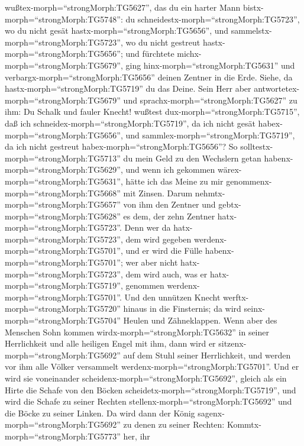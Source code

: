 wußtex-morph=``strongMorph:TG5627'', das du ein harter Mann
bistx-morph=``strongMorph:TG5748'': du
schneidestx-morph=``strongMorph:TG5723'', wo du nicht gesät
hastx-morph=``strongMorph:TG5656'', und
sammelstx-morph=``strongMorph:TG5723'', wo du nicht gestreut
hastx-morph=``strongMorph:TG5656'';  und fürchtete
michx-morph=``strongMorph:TG5679'', ging
hinx-morph=``strongMorph:TG5631'' und
verbargx-morph=``strongMorph:TG5656'' deinen Zentner in die Erde. Siehe,
da hastx-morph=``strongMorph:TG5719'' du das Deine.  Sein
Herr aber antwortetex-morph=``strongMorph:TG5679'' und
sprachx-morph=``strongMorph:TG5627'' zu ihm: Du Schalk und fauler
Knecht! wußtest dux-morph=``strongMorph:TG5715'', daß ich
schneidex-morph=``strongMorph:TG5719'', da ich nicht gesät
habex-morph=``strongMorph:TG5656'', und
sammlex-morph=``strongMorph:TG5719'', da ich nicht gestreut
habex-morph=``strongMorph:TG5656''?  So
solltestx-morph=``strongMorph:TG5713'' du mein Geld zu den Wechslern
getan habenx-morph=``strongMorph:TG5629'', und wenn ich gekommen
wärex-morph=``strongMorph:TG5631'', hätte ich das Meine zu mir
genommenx-morph=``strongMorph:TG5668'' mit Zinsen.  Darum
nehmtx-morph=``strongMorph:TG5657'' von ihm den Zentner und
gebtx-morph=``strongMorph:TG5628'' es dem, der zehn Zentner
hatx-morph=``strongMorph:TG5723''.  Denn wer da
hatx-morph=``strongMorph:TG5723'', dem wird gegeben
werdenx-morph=``strongMorph:TG5701'', und er wird die Fülle
habenx-morph=``strongMorph:TG5701''; wer aber nicht
hatx-morph=``strongMorph:TG5723'', dem wird auch, was er
hatx-morph=``strongMorph:TG5719'', genommen
werdenx-morph=``strongMorph:TG5701''.  Und den unnützen
Knecht werftx-morph=``strongMorph:TG5720'' hinaus in die Finsternis; da
wird seinx-morph=``strongMorph:TG5704'' Heulen und Zähneklappen.
 Wenn aber des Menschen Sohn kommen
wirdx-morph=``strongMorph:TG5632'' in seiner Herrlichkeit und alle
heiligen Engel mit ihm, dann wird er
sitzenx-morph=``strongMorph:TG5692'' auf dem Stuhl seiner Herrlichkeit,
 und werden vor ihm alle Völker versammelt
werdenx-morph=``strongMorph:TG5701''. Und er wird sie voneinander
scheidenx-morph=``strongMorph:TG5692'', gleich als ein Hirte die Schafe
von den Böcken scheidetx-morph=``strongMorph:TG5719'',  und
wird die Schafe zu seiner Rechten stellenx-morph=``strongMorph:TG5692''
und die Böcke zu seiner Linken.  Da wird dann der König
sagenx-morph=``strongMorph:TG5692'' zu denen zu seiner Rechten:
Kommtx-morph=``strongMorph:TG5773'' her, ihr
